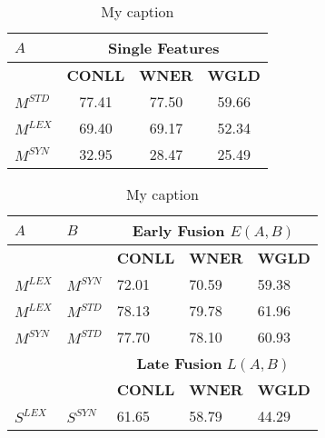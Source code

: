 \begin{table}[h]
\centering
\setlength\tabcolsep{4pt}
\begin{minipage}{0.48\textwidth}
\centering
\begin{tabular}{@{}lccc@{}}
\toprule
$A$                           & \multicolumn{3}{c}{\textbf{Single Features}} \\ \midrule
                & \textbf{CONLL}    & \textbf{WNER}     & \textbf{WGLD}    \\ \cmidrule{2-4}
$M^{STD}$                        & 77.41    & 77.50    & 59.66   \\
$M^{LEX}$                       & 69.40    & 69.17    & 52.34   \\
$M^{SYN}$                        & 32.95    & 28.47    & 25.49   \\ \bottomrule
\end{tabular}
\caption{My caption}
\label{my-label}
\end{minipage}
\hfill
\begin{minipage}{0.48\textwidth}
\centering
\begin{tabular}{@{}lllll@{}}
\toprule
    $A$      &    $B$       & \multicolumn{3}{c}{\textbf{Early Fusion} $E(A,B)$}                                            \\ \midrule
          &           & \textbf{CONLL}                      & \textbf{WNER}                      & \textbf{WGLD}                      \\ \cmidrule{3-5}
$M^{LEX}$ & $M^{SYN}$ & 72.01                      & 70.59                     & 59.38                     \\
$M^{LEX}$ & $M^{STD}$ & 78.13                      & 79.78                     & 61.96                     \\
$M^{SYN}$ & $M^{STD}$ & 77.70                      & 78.10                     & 60.93                     \\
\midrule
          &           & \multicolumn{3}{c}{\textbf{Late Fusion} $L(A,B)$}                                             \\
\midrule     
          &           & \textbf{CONLL}                      & \textbf{WNER}                      & \textbf{WGLD}                      \\ \cmidrule{3-5}
$S^{LEX}$ & $S^{SYN}$ & 61.65                      & 58.79                     & 44.29                     \\

\end{tabular}
\end{minipage}
\end{table}
